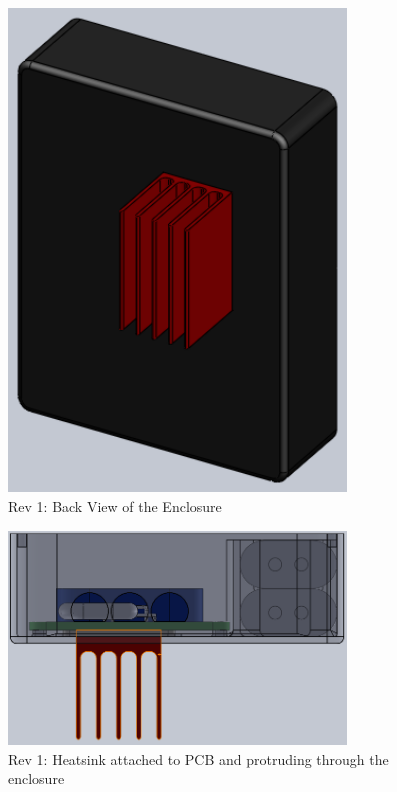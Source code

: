 \documentclass{article}
\numberwithin{figure}{section}
\numberwithin{equation}{section}
\begin{document}
{\begin{figure}[H]
	\centering
	\includegraphics[width=0.8\textwidth]{Assembly3}
	\caption{Rev 1: Back View of the Enclosure}
	\label{fig:append_enclosureback}
\end{figure}

\begin{figure}[H]
	\centering
	\includegraphics[width=0.8\textwidth]{Assembly4}
	\caption{Rev 1: Heatsink attached to PCB and protruding through the enclosure}
	\label{fig:append_heatsink}
\end{figure}

}
\end{document}
